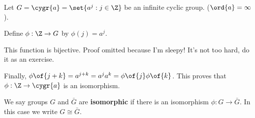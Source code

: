 \begin{example}
    Let $G = \cygr{a} = \set{a^j: j \in \Z}$ be an infinite cyclic group. ($\ord{a} = \infty$).

    Define $\phi: \Z \to G$ by $\phi(j) = a^j$.

    This function is bijective. Proof omitted because I'm sleepy! It's not too hard, do it as an exercise.

    Finally, $\phi\of{j+k} = a^{j+k} = a^j a^k = \phi\of{j} \phi\of{k}$. This proves that $\phi: \Z \to \cygr{a}$ is an isomorphism.
\end{example}

\begin{definition}
    We say groups $G$ and $\bar{G}$ are \textbf{isomorphic} if there is an isomorphism $\phi: G \to \bar{G}$. In this case we write $G \cong \bar{G}$.
\end{definition}

